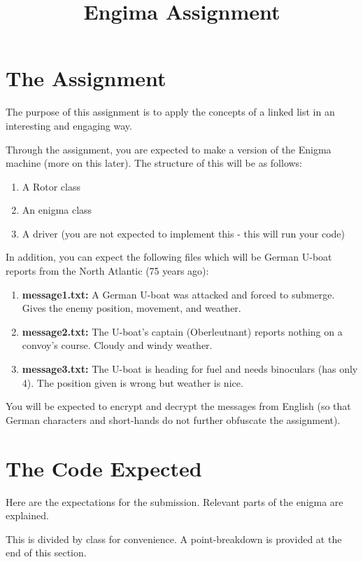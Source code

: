 \documentclass[11pt]{article}
\title{Engima Assignment}
\begin{document}
\maketitle

\section{The Assignment}

The purpose of this assignment is to apply the concepts of a linked list in an interesting and engaging way.

Through the assignment, you are expected to make a version of the Enigma machine (more on this later).
The structure of this will be as follows:
\begin{enumerate}
\item A Rotor class
\item An enigma class
\item A driver (you are not expected to implement this - this will run your code)
\end{enumerate}

In addition, you can expect the following files which will be German U-boat reports from the North Atlantic (75 years ago):
\begin{enumerate}
  \item \textbf{message1.txt:} A German U-boat was attacked and forced to submerge. Gives the enemy position, movement, and weather.
  \item \textbf{message2.txt:} The U-boat's captain (Oberleutnant) reports nothing on a convoy's course. Cloudy and windy weather.
  \item \textbf{message3.txt:} The U-boat is heading for fuel and needs binoculars (has only 4). The position given is wrong but weather is nice.
\end{enumerate}
You will be expected to encrypt and decrypt the messages from English
(so that German characters and short-hands do not further obfuscate the assignment).

\section{The Code Expected}
Here are the expectations for the submission. Relevant parts of the enigma are explained.

This is divided by class for convenience. A point-breakdown is provided at the end of this section.
\end{document}
